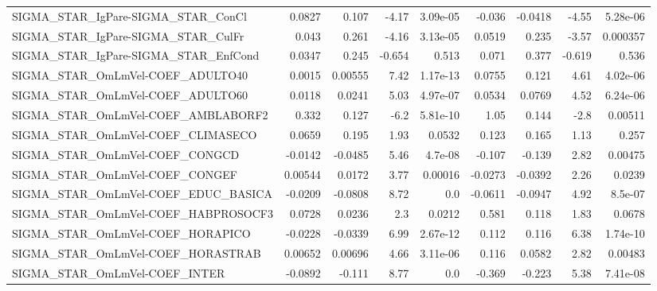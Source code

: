 \begin{tabular}{lrrrrrrrr}
SIGMA\_STAR\_IgPare-SIGMA\_STAR\_ConCl     &      0.0827 &        0.107 &   -4.17 & 3.09e-05 &     -0.036 &     -0.0418 &        -4.55 &      5.28e-06 \\
SIGMA\_STAR\_IgPare-SIGMA\_STAR\_CulFr     &       0.043 &        0.261 &   -4.16 & 3.13e-05 &     0.0519 &       0.235 &        -3.57 &      0.000357 \\
SIGMA\_STAR\_IgPare-SIGMA\_STAR\_EnfCond   &      0.0347 &        0.245 &  -0.654 &    0.513 &      0.071 &       0.377 &       -0.619 &         0.536 \\
SIGMA\_STAR\_OmLmVel-COEF\_ADULTO40       &      0.0015 &      0.00555 &    7.42 & 1.17e-13 &     0.0755 &       0.121 &         4.61 &      4.02e-06 \\
SIGMA\_STAR\_OmLmVel-COEF\_ADULTO60       &      0.0118 &       0.0241 &    5.03 & 4.97e-07 &     0.0534 &      0.0769 &         4.52 &      6.24e-06 \\
SIGMA\_STAR\_OmLmVel-COEF\_AMBLABORF2     &       0.332 &        0.127 &    -6.2 & 5.81e-10 &       1.05 &       0.144 &         -2.8 &       0.00511 \\
SIGMA\_STAR\_OmLmVel-COEF\_CLIMASECO      &      0.0659 &        0.195 &    1.93 &   0.0532 &      0.123 &       0.165 &         1.13 &         0.257 \\
SIGMA\_STAR\_OmLmVel-COEF\_CONGCD         &     -0.0142 &      -0.0485 &    5.46 &  4.7e-08 &     -0.107 &      -0.139 &         2.82 &       0.00475 \\
SIGMA\_STAR\_OmLmVel-COEF\_CONGEF         &     0.00544 &       0.0172 &    3.77 &  0.00016 &    -0.0273 &     -0.0392 &         2.26 &        0.0239 \\
SIGMA\_STAR\_OmLmVel-COEF\_EDUC\_BASICA    &     -0.0209 &      -0.0808 &    8.72 &      0.0 &    -0.0611 &     -0.0947 &         4.92 &       8.5e-07 \\
SIGMA\_STAR\_OmLmVel-COEF\_HABPROSOCF3    &      0.0728 &       0.0236 &     2.3 &   0.0212 &      0.581 &       0.118 &         1.83 &        0.0678 \\
SIGMA\_STAR\_OmLmVel-COEF\_HORAPICO       &     -0.0228 &      -0.0339 &    6.99 & 2.67e-12 &      0.112 &       0.116 &         6.38 &      1.74e-10 \\
SIGMA\_STAR\_OmLmVel-COEF\_HORASTRAB      &     0.00652 &      0.00696 &    4.66 & 3.11e-06 &      0.116 &      0.0582 &         2.82 &       0.00483 \\
SIGMA\_STAR\_OmLmVel-COEF\_INTER          &     -0.0892 &       -0.111 &    8.77 &      0.0 &     -0.369 &      -0.223 &         5.38 &      7.41e-08 \\

\end{tabular}
